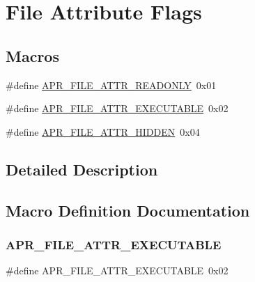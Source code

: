 \hypertarget{group__apr__file__attrs__set__flags}{}\section{File Attribute Flags}
\label{group__apr__file__attrs__set__flags}
\subsection*{Macros}
\begin{DoxyCompactItemize}
\item 
\#define \mbox{\hyperlink{group__apr__file__attrs__set__flags_ga333f2c798495cfb95ee624e11c862e38}{A\+P\+R\+\_\+\+F\+I\+L\+E\+\_\+\+A\+T\+T\+R\+\_\+\+R\+E\+A\+D\+O\+N\+LY}}~0x01
\item 
\#define \mbox{\hyperlink{group__apr__file__attrs__set__flags_ga51346f433e354f0bc8722388b6b275fd}{A\+P\+R\+\_\+\+F\+I\+L\+E\+\_\+\+A\+T\+T\+R\+\_\+\+E\+X\+E\+C\+U\+T\+A\+B\+LE}}~0x02
\item 
\#define \mbox{\hyperlink{group__apr__file__attrs__set__flags_ga68c188c0e56b9abdef3c97ffd913c5aa}{A\+P\+R\+\_\+\+F\+I\+L\+E\+\_\+\+A\+T\+T\+R\+\_\+\+H\+I\+D\+D\+EN}}~0x04
\end{DoxyCompactItemize}


\subsection{Detailed Description}


\subsection{Macro Definition Documentation}
\mbox{\label{group__apr__file__attrs__set__flags_ga51346f433e354f0bc8722388b6b275fd}} 
\subsubsection{\texorpdfstring{A\+P\+R\+\_\+\+F\+I\+L\+E\+\_\+\+A\+T\+T\+R\+\_\+\+E\+X\+E\+C\+U\+T\+A\+B\+LE}{APR\_FILE\_ATTR\_EXECUTABLE}}
{\footnotesize\ttfamily \#define A\+P\+R\+\_\+\+F\+I\+L\+E\+\_\+\+A\+T\+T\+R\+\_\+\+E\+X\+E\+C\+U\+T\+A\+B\+LE~0x02}

